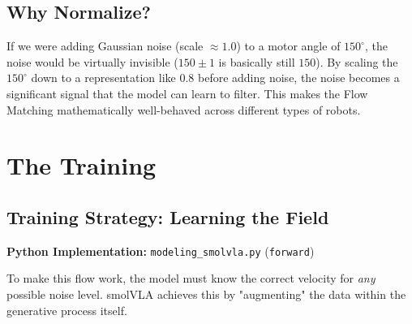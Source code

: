 \documentclass[11pt,a4paper]{article}
\begin{document}
\subsection{Why Normalize?}
If we were adding Gaussian noise (scale $\approx 1.0$) to a motor angle of $150^\circ$, the noise would be virtually invisible ($150 \pm 1$ is basically still $150$). By scaling the $150^\circ$ down to a representation like $0.8$ before adding noise, the noise becomes a significant signal that the model can learn to filter. This makes the Flow Matching mathematically well-behaved across different types of robots.

\section{The Training}

\subsection{Training Strategy: Learning the Field}
\textbf{Python Implementation:} \texttt{modeling\_smolvla.py} (\texttt{forward})

To make this flow work, the model must know the correct velocity for \textit{any} possible noise level. smolVLA achieves this by "augmenting" the data within the generative process itself.
\end{document}
